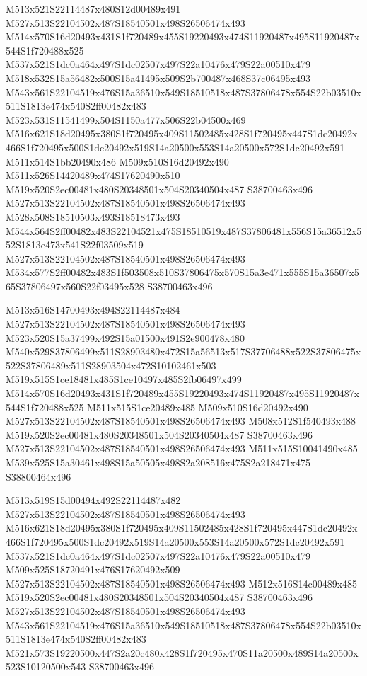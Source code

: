 \documentclass{article}
\begin{document}
\begin{multicols}{2}
M513x521S22114487x480S12d00489x491 M527x513S22104502x487S18540501x498S26506474x493 M514x570S16d20493x431S1f720489x455S19220493x474S11920487x495S11920487x544S1f720488x525 M537x521S1dc0a464x497S1dc02507x497S22a10476x479S22a00510x479 M518x532S15a56482x500S15a41495x509S2b700487x468S37c06495x493 M543x561S22104519x476S15a36510x549S18510518x487S37806478x554S22b03510x511S1813e474x540S2ff00482x483 M523x531S11541499x504S1150a477x506S22b04500x469 M516x621S18d20495x380S1f720495x409S11502485x428S1f720495x447S1dc20492x466S1f720495x500S1dc20492x519S14a20500x553S14a20500x572S1dc20492x591 M511x514S1bb20490x486 M509x510S16d20492x490 M511x526S14420489x474S17620490x510 M519x520S2ec00481x480S20348501x504S20340504x487 S38700463x496 M527x513S22104502x487S18540501x498S26506474x493 M528x508S18510503x493S18518473x493 M544x564S2ff00482x483S22104521x475S18510519x487S37806481x556S15a36512x552S1813e473x541S22f03509x519 M527x513S22104502x487S18540501x498S26506474x493 M534x577S2ff00482x483S1f503508x510S37806475x570S15a3e471x555S15a36507x565S37806497x560S22f03495x528 S38700463x496

M513x516S14700493x494S22114487x484 M527x513S22104502x487S18540501x498S26506474x493 M523x520S15a37499x492S15a01500x491S2e900478x480 M540x529S37806499x511S28903480x472S15a56513x517S37706488x522S37806475x522S37806489x511S28903504x472S10102461x503 M519x515S1ce18481x485S1ce10497x485S2fb06497x499 M514x570S16d20493x431S1f720489x455S19220493x474S11920487x495S11920487x544S1f720488x525 M511x515S1ce20489x485 M509x510S16d20492x490 M527x513S22104502x487S18540501x498S26506474x493 M508x512S1f540493x488 M519x520S2ec00481x480S20348501x504S20340504x487 S38700463x496 M527x513S22104502x487S18540501x498S26506474x493 M511x515S10041490x485 M539x525S15a30461x498S15a50505x498S2a208516x475S2a218471x475 S38800464x496

M513x519S15d00494x492S22114487x482 M527x513S22104502x487S18540501x498S26506474x493 M516x621S18d20495x380S1f720495x409S11502485x428S1f720495x447S1dc20492x466S1f720495x500S1dc20492x519S14a20500x553S14a20500x572S1dc20492x591 M537x521S1dc0a464x497S1dc02507x497S22a10476x479S22a00510x479 M509x525S18720491x476S17620492x509 M527x513S22104502x487S18540501x498S26506474x493 M512x516S14c00489x485 M519x520S2ec00481x480S20348501x504S20340504x487 S38700463x496 M527x513S22104502x487S18540501x498S26506474x493 M543x561S22104519x476S15a36510x549S18510518x487S37806478x554S22b03510x511S1813e474x540S2ff00482x483 M521x573S19220500x447S2a20c480x428S1f720495x470S11a20500x489S14a20500x523S10120500x543 S38700463x496


\end{multicols}
\end{document}
